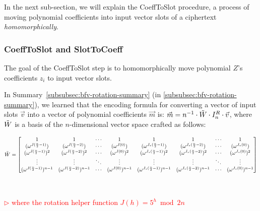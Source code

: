 In the next sub-section, we will explain the \textsf{CoeffToSlot} procedure, a process of moving polynomial coefficients into input vector slots of a ciphertext \textit{homomorphically}. 

\subsubsection{\textsf{CoeffToSlot} and \textsf{SlotToCoeff}}
\label{subsubsec:bfv-bootstrapping-coefftoslot}

The goal of the \textsf{CoeffToSlot} step is to homomorphically move polynomial $Z$'s coefficients $z_i$ to input vector slots. 


In Summary~\ref*{subsubsec:bfv-rotation-summary} (in \autoref{subsubsec:bfv-rotation-summary}), we learned that the encoding formula for converting a vector of input slots $\vec{v}$ into a vector of polynomial coefficients $\vec{m}$ is: $\vec{m} = n^{-1}\cdot\tilde{W} \cdot I_n^R \cdot \vec{v}$, where $\tilde{W}$ is a basis of the $n$-dimensional vector space crafted as follows: 

$\tilde{W} = \begin{bmatrix}
1 & 1 & \cdots & 1 & 1 & 1 & \cdots & 1\\
(\omega^{J(\frac{n}{2} - 1)}) & (\omega^{J(\frac{n}{2} - 2)}) & \cdots & (\omega^{J(0)}) & (\omega^{J_*(\frac{n}{2} - 1)}) & (\omega^{J_*(\frac{n}{2} - 2)}) & \cdots & (\omega^{J_*(0)})\\
(\omega^{J(\frac{n}{2} - 1)})^2 & (\omega^{J(\frac{n}{2} - 2)})^2 & \cdots & (\omega^{J(0)})^2 & (\omega^{J_*(\frac{n}{2} - 1)})^2 & (\omega^{J_*(\frac{n}{2} - 2)})^2 & \cdots & (\omega^{J_*(0)})^2 \\
\vdots & \vdots & \ddots & \vdots & \vdots & \vdots & \ddots & \vdots \\
(\omega^{J(\frac{n}{2} - 1)})^{n-1} & (\omega^{J(\frac{n}{2} - 2)})^{n-1} & \cdots & (\omega^{J(0)})^{n-1} & (\omega^{J_*(\frac{n}{2} - 1)})^{n-1} & (\omega^{J_*(\frac{n}{2} - 2)})^{n-1} & \cdots  & (\omega^{J_*(0)})^{n-1}
\end{bmatrix}$

$ $

\textcolor{red}{ $\rhd$ where the rotation helper function $J(h) = 5^h \bmod 2n$}

$ $

